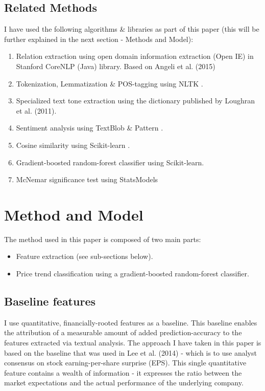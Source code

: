 \documentclass[11pt,a4paper]{article}
\begin{document}
\subsection{Related Methods}
I have used the following algorithms \& libraries as part of this paper (this will be further explained in the next section - Methods and Model):
\begin{enumerate}
  \item Relation extraction using open domain information extraction (Open IE) in Stanford CoreNLP (Java) library. Based on Angeli et al. (2015) \cite{angeli2015leveraging}
  \item Tokenization, Lemmatization \& POS-tagging using NLTK \cite{loper2002nltk}.
  \item Specialized text tone extraction using the dictionary published by Loughran et al. (2011).
  \item Sentiment analysis using TextBlob \& Pattern \cite{smedt2012pattern}.
  \item Cosine similarity using Scikit-learn \cite{pedregosa2011scikit}.
  \item Gradient-boosted random-forest classifier using Scikit-learn.  
  \item McNemar significance test using StatsModels \cite{seabold2010statsmodels}
\end{enumerate}

\section{Method and Model}

The method used in this paper is composed of two main parts:
\begin{itemize}
  \item Feature extraction (see sub-sections below).
  \item Price trend classification using a gradient-boosted random-forest classifier.
\end{itemize}

\subsection{Baseline features}
I use quantitative, financially-rooted features as a baseline. This baseline enables the attribution of a measurable amount of added prediction-accuracy to the features extracted via textual analysis. The approach I have taken in this paper is based on the baseline that was used in Lee et al. (2014) - which is to use analyst consensus on stock earning-per-share surprise (EPS). This single quantitative feature contains a wealth of information  - it expresses the ratio between the market expectations and the actual performance of the underlying company. 
\end{document}
